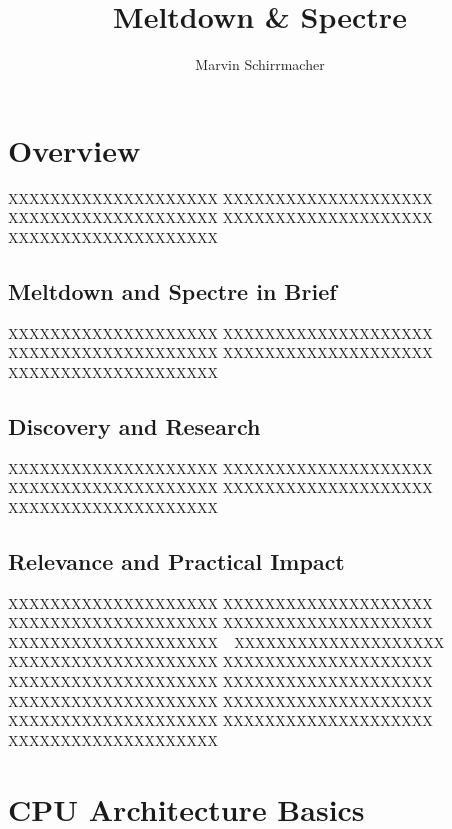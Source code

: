 \documentclass[a4paper,oneside,openright] {scrreprt}
\title{\Huge Meltdown \& Spectre}
\author{\Large Marvin Schirrmacher}
\begin{document}


\pagestyle{plain}
\cleardoublepage
{}
\tableofcontents
\clearpage
{}


\chapter{Overview}  
\label{ch:intro}

XXXXXXXXXXXXXXXXXXXX
XXXXXXXXXXXXXXXXXXXX
XXXXXXXXXXXXXXXXXXXX
XXXXXXXXXXXXXXXXXXXX
XXXXXXXXXXXXXXXXXXXX


\section{Meltdown and Spectre in Brief}
\label{ch:intro:motivation}

XXXXXXXXXXXXXXXXXXXX
XXXXXXXXXXXXXXXXXXXX
XXXXXXXXXXXXXXXXXXXX
XXXXXXXXXXXXXXXXXXXX
XXXXXXXXXXXXXXXXXXXX

\section{Discovery and Research}
\label{ch:intro:discoveryAndResearch}

XXXXXXXXXXXXXXXXXXXX
XXXXXXXXXXXXXXXXXXXX
XXXXXXXXXXXXXXXXXXXX
XXXXXXXXXXXXXXXXXXXX
XXXXXXXXXXXXXXXXXXXX

\section{Relevance and Practical Impact}
\label{ch:intro:motivation}

XXXXXXXXXXXXXXXXXXXX
XXXXXXXXXXXXXXXXXXXX
XXXXXXXXXXXXXXXXXXXX
XXXXXXXXXXXXXXXXXXXX
XXXXXXXXXXXXXXXXXXXX
~\cite{Rivest:83:RSA}
XXXXXXXXXXXXXXXXXXXX
XXXXXXXXXXXXXXXXXXXX
XXXXXXXXXXXXXXXXXXXX
XXXXXXXXXXXXXXXXXXXX
XXXXXXXXXXXXXXXXXXXX
~\cite{Garfinkel:03:VMI}
XXXXXXXXXXXXXXXXXXXX
XXXXXXXXXXXXXXXXXXXX
XXXXXXXXXXXXXXXXXXXX
XXXXXXXXXXXXXXXXXXXX
XXXXXXXXXXXXXXXXXXXX


\chapter{CPU Architecture Basics}
\label{ch:background}
\end{document}
